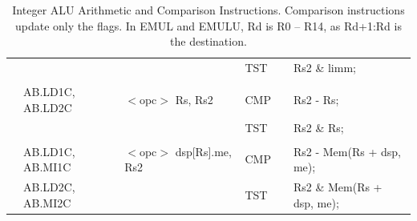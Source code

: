 \begin{table}
\begin{center}
\begin{tabular}{llllll}
                   &                   &                                       & TST               & \flags{-**-}      & Rs2 \& limm;                                                                  \\
                   &                   &                                       &                   &                   &                                                                               \\
                   & AB.LD1C, AB.LD2C  & $<$opc$>$ Rs, Rs2                     & CMP               & \flags{****}      & Rs2 - Rs;                                                                     \\
                   &                   &                                       & TST               & \flags{-**-}      & Rs2 \& Rs;                                                                    \\
                   &                   &                                       &                   &                   &                                                                               \\
                   & AB.LD1C, AB.MI1C  & $<$opc$>$ dsp[Rs].me, Rs2             & CMP               & \flags{****}      & Rs2 - Mem(Rs + dsp, me);                                                      \\
                   & AB.LD2C, AB.MI2C  &                                       & TST               & \flags{-**-}      & Rs2 \& Mem(Rs + dsp, me);                                                     \\ \hline
\end{tabular}
\end{center}
\captionsetup{font=scriptsize, labelfont=scriptsize}
\caption{Integer ALU Arithmetic and Comparison Instructions. Comparison instructions update only the flags.
In EMUL and EMULU, Rd is R0 -- R14, as Rd+1:Rd is the destination.}
\end{table}


